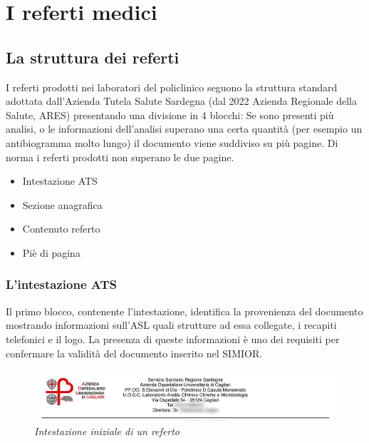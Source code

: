 \chapter{I referti medici}
\section{La struttura dei referti}
I referti prodotti nei laboratori del policlinico seguono la struttura standard adottata dall'Azienda Tutela Salute Sardegna (dal 2022 Azienda Regionale della Salute, ARES) 
presentando una divisione in 4 blocchi:
Se sono presenti più analisi, o le informazioni dell'analisi superano una certa quantità (per esempio un antibiogramma molto lungo) il documento viene suddiviso su più pagine.
Di norma i referti prodotti non superano le due pagine.

\begin{center}
	\begin{itemize}
		\item Intestazione ATS
		\item Sezione anagrafica
		\item Contenuto referto
		\item Piè di pagina
		\end{itemize}
\end{center}
\par\bigskip
\newpage
\subsection{L'intestazione ATS}
Il primo blocco, contenente l'intestazione, identifica la provenienza del documento mostrando informazioni sull'ASL quali strutture ad essa collegate, i recapiti telefonici e il logo.
La presenza di queste informazioni è uno dei requisiti per confermare la validità del documento inserito nel SIMIOR.
\begin{figure}[h!]
	\centering
	\includegraphics[width=.99\columnwidth]{images/header.png}
	\caption{\textit{Intestazione iniziale di un referto}}
	\label{fig:header}
\end{figure}
\bigskip
\newline
